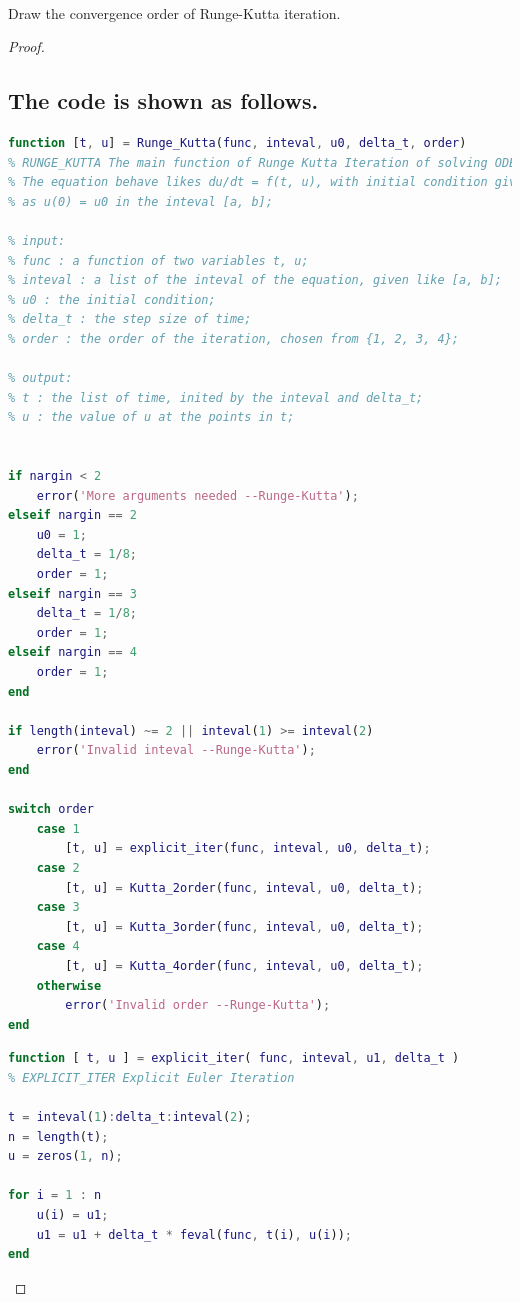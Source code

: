 \documentclass{article}
\newenvironment{problem}[2][Problem]{\begin{trivlist}
\item[\hskip \labelsep {\bfseries #1}\hskip \labelsep {\bfseries #2.}]}{\end{trivlist}}
\begin{document}
\begin{problem}{2}
\text{ }\\
Draw the convergence order of Runge-Kutta iteration.
\end{problem}
\begin{proof}
\subsection{The code is shown as follows.}
\begin{lstlisting}[language = {MATLAB}]
function [t, u] = Runge_Kutta(func, inteval, u0, delta_t, order)
% RUNGE_KUTTA The main function of Runge Kutta Iteration of solving ODEs
% The equation behave likes du/dt = f(t, u), with initial condition given 
% as u(0) = u0 in the inteval [a, b];

% input:
% func : a function of two variables t, u;
% inteval : a list of the inteval of the equation, given like [a, b];
% u0 : the initial condition;
% delta_t : the step size of time;
% order : the order of the iteration, chosen from {1, 2, 3, 4};

% output:
% t : the list of time, inited by the inteval and delta_t;
% u : the value of u at the points in t;


if nargin < 2
    error('More arguments needed --Runge-Kutta');
elseif nargin == 2
    u0 = 1;
    delta_t = 1/8;
    order = 1;
elseif nargin == 3
    delta_t = 1/8;
    order = 1;
elseif nargin == 4
    order = 1;
end

if length(inteval) ~= 2 || inteval(1) >= inteval(2)
    error('Invalid inteval --Runge-Kutta');
end

switch order
    case 1
        [t, u] = explicit_iter(func, inteval, u0, delta_t);
    case 2
        [t, u] = Kutta_2order(func, inteval, u0, delta_t);
    case 3
        [t, u] = Kutta_3order(func, inteval, u0, delta_t);
    case 4
        [t, u] = Kutta_4order(func, inteval, u0, delta_t);
    otherwise
        error('Invalid order --Runge-Kutta');
end
\end{lstlisting}

\begin{lstlisting}[language = {MATLAB}]
function [ t, u ] = explicit_iter( func, inteval, u1, delta_t )
% EXPLICIT_ITER Explicit Euler Iteration

t = inteval(1):delta_t:inteval(2);
n = length(t);
u = zeros(1, n);

for i = 1 : n
    u(i) = u1;
    u1 = u1 + delta_t * feval(func, t(i), u(i));
end
\end{lstlisting}


\end{proof}
\end{document}
